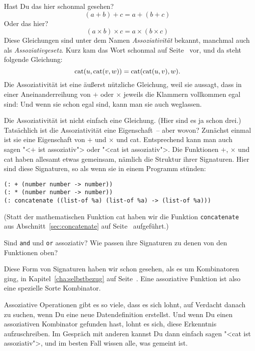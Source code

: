 Hast Du das hier schonmal gesehen?
%
\begin{displaymath}
  (a + b) + c = a + (b + c)
\end{displaymath}
%
Oder das hier?
%
\begin{displaymath}
  (a \times b) \times c = a \times (b \times c)
\end{displaymath}
%
Diese Gleichungen sind unter dem Namen
\textit{Assoziativität} bekannt, manchmal auch
als \textit{Assoziativgesetz}.  Kurz kam das Wort schonmal auf
Seite~\pageref{page:assoziativitaet} vor, und da steht folgende Gleichung:
%
\begin{displaymath}
  {\rm cat}(u,{\rm cat}(v,w))  = {\rm cat}({\rm cat}(u,v),w).
\end{displaymath}
%
Die Assoziativität ist eine äußerst nützliche Gleichung, weil sie
aussagt, dass in einer Aneinanderreihung von $+$ oder $\times$ jeweils
die Klammern vollkommen egal sind: Und wenn sie schon egal sind, kann
man sie auch weglassen.

Die Assoziativität ist nicht einfach eine Gleichung.  (Hier sind es ja
schon drei.)  Tatsächlich ist die Assoziativität eine Eigenschaft~--
aber wovon?  Zunächst einmal ist sie eine Eigenschaft von $+$ und
$\times$ und cat.  Entsprechend kann man auch sagen "<$+$ ist
assoziativ"> oder "<cat ist assoziativ">.  Die Funktionen $+$,
$\times$ und cat haben allesamt etwas gemeinsam, nämlich die Struktur
ihrer Signaturen.  Hier sind diese Signaturen, so als wenn sie in
einem Programm stünden:
%
\begin{lstlisting}
(: + (number number -> number))
(: * (number number -> number))
(: concatenate ((list-of %a) (list-of %a) -> (list-of %a)))
\end{lstlisting}
%
(Statt der mathematischen Funktion cat haben wir die Funktion
\lstinline{concatenate} aus Abschnitt~\ref{sec:concatenate} auf
Seite~\pageref{sec:concatenate} aufgeführt.)
%
\begin{aufgabeinline}
  Sind \lstinline{and} und \lstinline{or} assoziativ?  Wie passen ihre
  Signaturen zu denen von den Funktionen oben?
\end{aufgabeinline}
%
Diese Form von Signaturen haben wir schon gesehen, als es um
Kombinatoren ging, in Kapitel~\ref{cha:selbstbezug} auf
Seite~\pageref{cha:selbstbezug}.  Eine assoziative Funktion ist also
eine spezielle Sorte Kombinator.

Assoziative Operationen gibt es so viele, dass es sich lohnt, auf
Verdacht danach zu suchen, wenn Du eine neue Datendefinition
erstellst.  Und wenn Du einen assoziativen Kombinator gefunden hast,
lohnt es sich, diese Erkenntnis aufzuschreiben.  Im Gespräch mit
anderen kannst Du dann einfach sagen "<cat ist assoziativ">, und im
besten Fall wissen alle, was gemeint ist.

